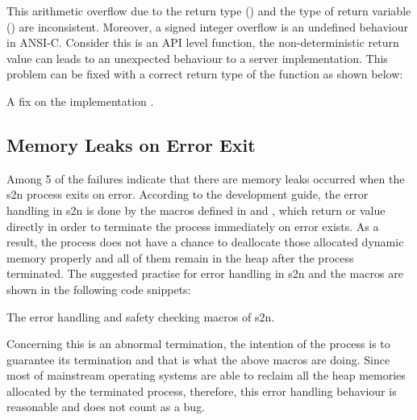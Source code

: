 This arithmetic overflow due to the return type () and the type of return variable () are inconsistent. Moreover, a signed integer overflow is an undefined behaviour in ANSI-C. Consider this is an API level function, the non-deterministic return value can leads to an unexpected behaviour to a server implementation. This problem can be fixed with a correct return type of the function as shown below:

\begin{listing}[ht]
\caption{A fix on the implementation .}
\end{listing}


\subsection{Memory Leaks on Error Exit}
Among 5 of the failures indicate that there are memory leaks occurred when the s2n process exits on error. According to the development guide, the error handling in s2n is done by the macros defined in  and , which return  or  value directly in order to terminate the process immediately on error exists. As a result, the process does not have a chance to deallocate those allocated dynamic memory properly and all of them remain in the heap after the process terminated. The suggested practise for error handling in s2n and the macros are shown in the following code snippets:

\begin{listing}[ht]


\caption{The error handling and safety checking macros of s2n.}
\end{listing}

Concerning this is an abnormal termination, the intention of the process is to guarantee its termination and that is what the above macros are doing. Since  most of mainstream operating systems are able to reclaim all the heap memories allocated by the terminated process, therefore, this error handling behaviour is reasonable and does not count as a bug.


